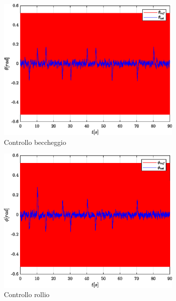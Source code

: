 \begin{figure}
	\centering
	\begin{subfigure}{0.45\textwidth}
		\centering
		\includegraphics[width=1\textwidth]{Simulazioni/Figure/PID/SNAKE_MIL/AttitudeControlPitch}
		\caption{Controllo beccheggio}
	\end{subfigure}
	\hfill
	\begin{subfigure}{0.45\textwidth}
		\centering
		\includegraphics[width=1\textwidth]{Simulazioni/Figure/PID/SNAKE_MIL/AttitudeControlRoll}
		\caption{Controllo rollio}
	\end{subfigure}
	\hfill
	\begin{subfigure}{0.45\textwidth}

\end{subfigure}
\end{figure}
